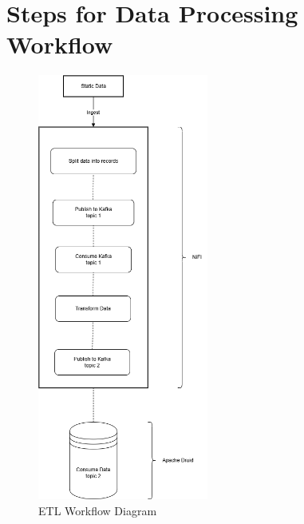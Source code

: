 \documentclass{article}
\begin{document}
\section*{Steps for Data Processing Workflow}

\begin{figure}[h!]
    \centering
    \includegraphics[width=0.5\textwidth]{ETL.png}
    \caption{ETL Workflow Diagram}
    \label{fig:etl_diagram}
\end{figure}
\end{document}
